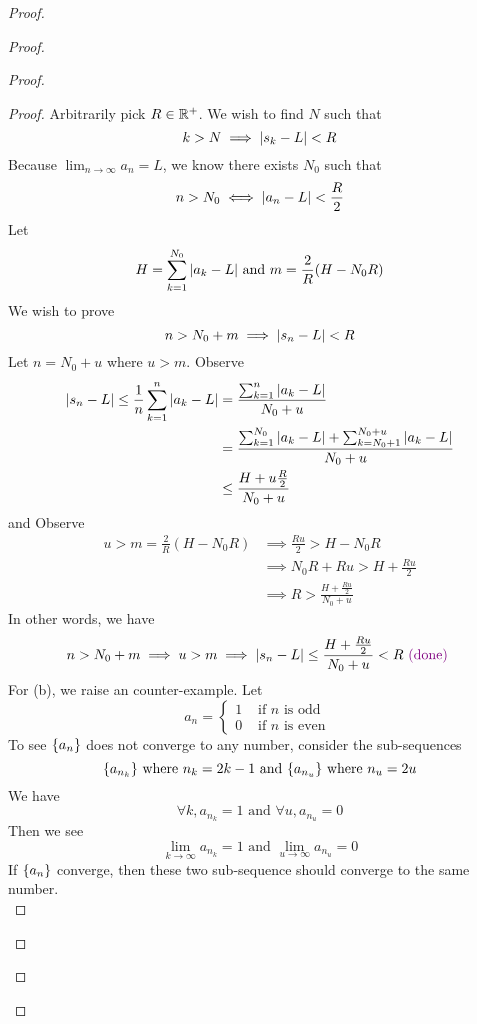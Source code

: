 \documentclass{report}
\begin{document}
\begin{proof}
\begin{proof}
\begin{proof}
\begin{proof}
Arbitrarily pick $R\in\mathbb{R}^+$. We wish to find $N$ such that 
 \begin{equation}
k>N\implies |s_k-L|<R
\end{equation}
Because $\lim_{n\to\infty}a_n=L$, we know there exists $N_0$ such that 
 \begin{equation}
n>N_0\iff |a_n-L|<\frac{R}{2}
\end{equation}
Let
\begin{equation}
H=\sum_{k=1}^{N_0} |a_k-L|\text{ and }m=\frac{2}{R}(H-N_0R)
\end{equation}
We wish to prove
\begin{equation}
n>N_0+m \implies |s_n-L|<R
\end{equation}
Let $n=N_0+u$ where $u>m$. Observe
\begin{align}
  |s_n-L|\leq \frac{1}{n}\sum_{k=1}^n |a_k-L|&=\frac{\sum_{k=1}^n |a_k-L|}{N_0+u}\\
  &= \frac{\sum_{k=1}^{N_0} |a_k-L|+\sum_{k=N_0+1}^{N_0+u} |a_k-L|}{N_0+u}\\
  &\leq \frac{H+u \frac{R}{2}}{N_0+u}
\end{align}
and Observe 
\begin{align}
  u>m=\frac{2}{R}(H-N_0R)&\implies \frac{Ru}{2}>H-N_0R\\
                         &\implies N_0R+ Ru>H+ \frac{Ru}{2}\\
&\implies R>\frac{H+\frac{Ru}{2}}{N_0+u}
\end{align}
In other words, we have
\begin{equation}
n>N_0+m \implies u>m\implies |s_n-L|\leq \frac{H+\frac{Ru}{2}}{N_0+u}<R\textcolor{violet}{\text{ (done) }}
\end{equation}
For (b), we raise an counter-example. Let
\begin{equation}
a_n=\begin{cases}
  1& \text{ if $n$ is odd }\\
  0& \text{ if $n$ is even }
\end{cases}
\end{equation}
To see $\{ a_n \}$ does not converge to any number, consider the sub-sequences
\begin{equation}
\{ a_{n_k} \}\text{ where }n_k=2k-1\text{ and }\{ a_{n_u} \}\text{ where }n_u=2u
\end{equation}
We have
\begin{equation}
\forall k,a_{n_k}=1\text{ and }\forall u,a_{n_u}=0
\end{equation}
Then we see 
\begin{equation}
\lim_{k\to\infty}a_{n_k}=1\text{ and }\lim_{u\to\infty}a_{n_u}=0
\end{equation}
If $\{ a_n \}$ converge, then these two sub-sequence should converge to the same number.\\


\end{proof}
\end{proof}
\end{proof}
\end{proof}
\end{document}
